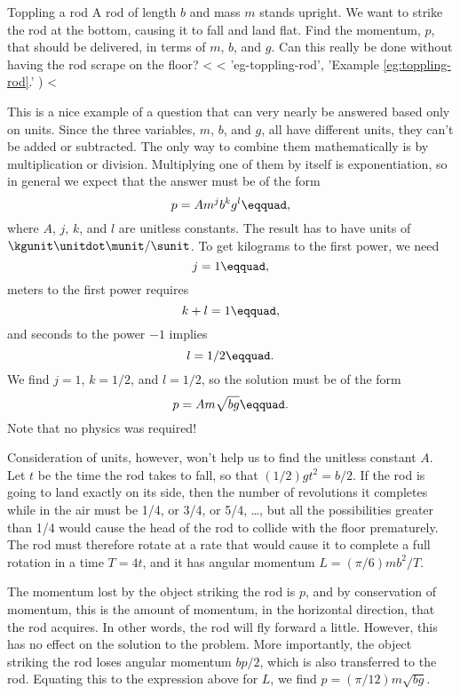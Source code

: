 \begin{eg}{Toppling a rod}\label{eg:toppling-rod}
\egquestion A rod of length $b$ and mass $m$ stands upright. We want
to strike the rod at the bottom, causing it to fall and land flat.
Find the momentum, $p$, that should be delivered, in terms of $m$, $b$,
and $g$. Can this really be done without having the rod scrape on the floor?
<%
<%
    'eg-toppling-rod',
    'Example \ref{eg:toppling-rod}.'
  )
<%

\eganswer This is a nice example of a question that can very nearly be
answered based only on units. Since the three variables, $m$, $b$,
and $g$, all have different units, they can't be added or subtracted.
The only way to combine them mathematically is by multiplication or division.
Multiplying one of them by itself is exponentiation, so in general
we expect that the answer must be of the form
\begin{equation*}
  p = A m^j b^k g^l\eqquad,
\end{equation*}
where $A$, $j$, $k$, and $l$ are unitless constants. The result has
to have units of $\kgunit\unitdot\munit/\sunit$. To get kilograms to
the first power, we need
\begin{equation*}
  j=1\eqquad,
\end{equation*}
meters to the first power requires
\begin{equation*}
  k+l=1\eqquad,
\end{equation*}
and
seconds to the power $-1$ implies
\begin{equation*}
  l=1/2\eqquad.
\end{equation*}
We find $j=1$, $k=1/2$, and $l=1/2$, so the solution must be of the form
\begin{equation*}
  p = A m\sqrt{bg}\eqquad.
\end{equation*}
Note that no physics was required!

Consideration of units, however, won't help us to find the unitless constant
$A$. Let $t$ be the time the rod takes to fall, so that $(1/2)gt^2=b/2$.
If the rod is going to land exactly on its side, then the number of revolutions
it completes while in the air must be 1/4, or 3/4, or 5/4,  \ldots, but all the
possibilities greater than 1/4 would cause the head of the rod to collide with
the floor prematurely. The rod must therefore rotate at a rate that would
cause it to complete a full rotation in a time $T=4t$, and it has angular
momentum $L=(\pi/6)mb^2/T$.

The momentum lost by the object striking
the rod is $p$, and by conservation of momentum, this is the amount of
momentum, in the horizontal direction, that the rod acquires. In other words,
the rod will fly forward a little. However, this has no effect on the solution
to the problem. More importantly, the object striking the rod loses angular
momentum $bp/2$, which is also transferred to the rod. Equating this to the
expression above for $L$, we find $p=(\pi/12)m\sqrt{bg}$.


\end{eg}
